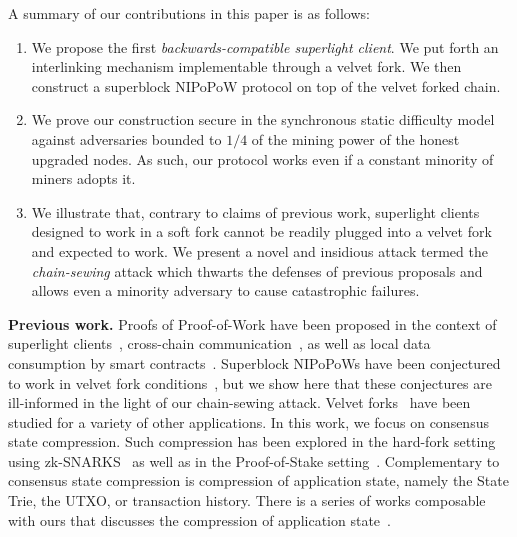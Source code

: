 A summary of our contributions in this paper is as follows:

\begin{enumerate}
  \item We propose the first \emph{backwards-compatible superlight client}. We
        put forth an interlinking mechanism implementable through a velvet fork.
        We then construct a superblock NIPoPoW protocol on top of the velvet
        forked chain.
  \item We prove our construction secure in the synchronous static difficulty
        model against adversaries bounded to $1/4$ of the mining power of the
        honest upgraded nodes. As such, our protocol works even if a constant
        minority of miners adopts it.
  \item We illustrate that, contrary to claims of previous work, superlight
        clients designed to work in a soft fork cannot be readily plugged into a
        velvet fork and expected to work. We present a novel and insidious
        attack termed the \emph{chain-sewing} attack which thwarts the defenses
        of previous proposals and allows even a minority adversary to cause
        catastrophic failures.
\end{enumerate}

\textbf{Previous work.} Proofs of Proof-of-Work have been proposed in the
context of superlight clients~\cite{pow,nipopows,flyclient},
cross-chain communication~\cite{pow-sidechains,burn,crosschain-sok}, as well as
local data consumption by smart contracts~\cite{derivatives}. Superblock
NIPoPoWs have been conjectured to work in velvet fork
conditions~\cite{nipopows}, but we show here that these conjectures are
ill-informed in the light of our chain-sewing attack. Velvet forks~\cite{velvet}
have been studied for a variety of other applications. In this work, we focus on
consensus state compression. Such compression has been explored in the hard-fork
setting using zk-SNARKS~\cite{coda} as well as in the Proof-of-Stake
setting~\cite{pos-sidechains}. Complementary to consensus state compression is
compression of application state, namely the State Trie, the UTXO, or
transaction history. There is a series of works composable with ours that
discusses the compression of application state~\cite{edrax,ethanos}.

\cite{backbone}\cite{selfish}
